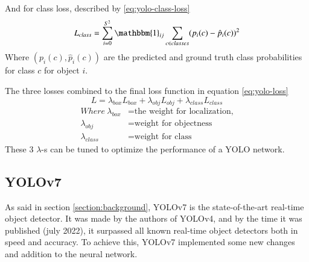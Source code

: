     And for class loss, described by \ref{eq:yolo-class-loss}
    \begin{equation}
      L_{class} = \sum_{i=0}^{S^2} \mathbbm{1}_{ij} \sum_{c \in classes} (p_i(c) - \hat{p}_i(c))^2
      \label{eq:yolo-class-loss}
    \end{equation}
    Where $(p_i(c), \hat{p}_i(c))$ are the predicted and ground truth class probabilities for class $c$ for object $i$.

    The three losses combined to the final loss function in equation \ref{eq:yolo-loss}
    \begin{equation}
      L = \lambda_{box}L_{box} + \lambda_{obj}L_{obj} + \lambda_{class}L_{class}
      \label{eq:yolo-loss}
    \end{equation}
    \begin{align*}
      Where~\lambda_{box} &= \text{the weight for localization,}\\
      \lambda_{obj} &= \text{weight for objectness}\\
      \lambda_{class} &= \text{weight for class}
    \end{align*}
    These 3 $\lambda$-s can be tuned to optimize the performance of a YOLO network.



  
      
  \subsection{YOLOv7}
  As said in section \ref{section:background}, YOLOv7 is the state-of-the-art real-time object detector.
  It was made by the authors of YOLOv4, and by the time it was published (july 2022), it surpassed all 
  known real-time object detectors both in speed and accuracy. To achieve this, YOLOv7 implemented some new
  changes and addition to the neural network. 
